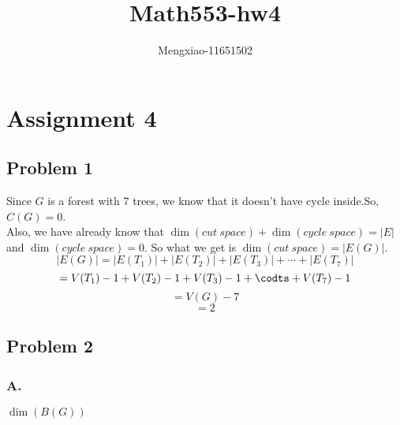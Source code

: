 \documentclass[12pt]{article}
\author{Mengxiao-11651502}
\title{Math553-hw4}
\begin{document}
    \maketitle
    \pagebreak
    \section{Assignment 4}
        \subsection{Problem 1}
            Since $G$ is a forest with 7 trees, we know that it doesn't have cycle inside.So, $C(G)=0$.\\
            Also, we have already know that $\dim(cut\ space)+\dim(cycle\ space)=|E|$ and $\dim(cycle\ space)=0$.
            So what we get is $\dim(cut\ space)=|E(G)|$.
            \[|E(G)|=|E(T_1)|+|E(T_2)|+|E(T_3)|+\cdots+|E(T_7)|\]
            \[=V(T_1)-1+V(T_2)-1+V(T_3)-1+\codts+V(T_7)-1\]
            \[=V(G)-7\]
            \[=2\]
        \subsection{Problem 2}
            \subsubsection{A.}
                $\dim(B(G))$
\end{document}
